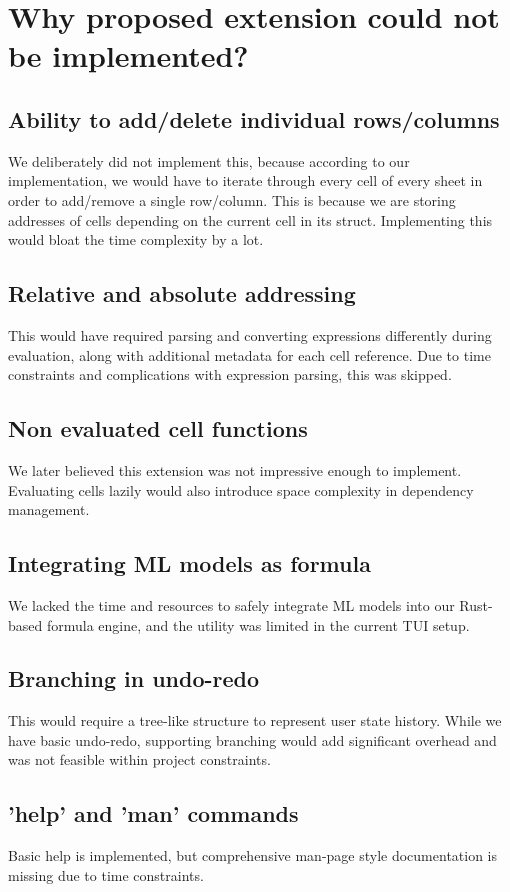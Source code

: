 \documentclass{article}
\begin{document}
\section{Why proposed extension could not be implemented?}
\subsection{Ability to add/delete individual rows/columns}
We deliberately did not implement this, because according to our implementation, we would have to iterate through every cell of every sheet in order to add/remove a single row/column. This is because we are storing addresses of cells depending on the current cell in its struct. Implementing this would bloat the time complexity by a lot.

\subsection{Relative and absolute addressing}
This would have required parsing and converting expressions differently during evaluation, along with additional metadata for each cell reference. Due to time constraints and complications with expression parsing, this was skipped.

\subsection{Non evaluated cell functions}
We later believed this extension was not impressive enough to implement. Evaluating cells lazily would also introduce space complexity in dependency management.

\subsection{Integrating ML models as formula}
We lacked the time and resources to safely integrate ML models into our Rust-based formula engine, and the utility was limited in the current TUI setup.

\subsection{Branching in undo-redo}
This would require a tree-like structure to represent user state history. While we have basic undo-redo, supporting branching would add significant overhead and was not feasible within project constraints.

\subsection{'help' and 'man' commands}
Basic help is implemented, but comprehensive man-page style documentation is missing due to time constraints.
\end{document}

